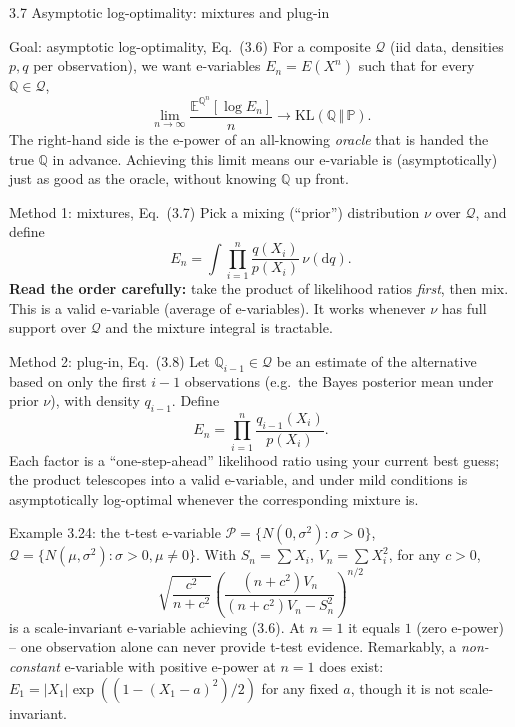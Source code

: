\documentclass[aspectratio=169,10pt]{beamer}
\newcommand{\PP}{\mathbb{P}}
\newcommand{\QQ}{\mathbb{Q}}
\newcommand{\EE}{\mathbb{E}}
\newcommand{\calP}{\mathcal{P}}
\newcommand{\calQ}{\mathcal{Q}}
\newcommand{\KL}[2]{\mathrm{KL}(#1 \,\Vert\, #2)}
\begin{document}
\begin{frame}[allowframebreaks]{3.7 Asymptotic log-optimality: mixtures and plug-in}
  \begin{block}{Goal: asymptotic log-optimality, Eq.~(3.6)}
    For a composite $\calQ$ (iid data, densities $p,q$ per observation), we want e-variables $E_n=E(X^n)$ such that for every $\QQ\in\calQ$,
    \[
      \lim_{n\to\infty} \frac{\EE^{\QQ^n}[\log E_n]}{n} \to \KL{\QQ}{\PP}.
    \]
    The right-hand side is the e-power of an all-knowing \emph{oracle} that is handed the true $\QQ$ in advance. Achieving this limit means our e-variable is (asymptotically) just as good as the oracle, without knowing $\QQ$ up front.
  \end{block}

  \begin{block}{Method 1: mixtures, Eq.~(3.7)}
    Pick a mixing (``prior'') distribution $\nu$ over $\calQ$, and define
    \[
      E_n = \int \prod_{i=1}^n \frac{q(X_i)}{p(X_i)}\,\nu(\mathrm{d}q).
    \]
    \textbf{Read the order carefully:} take the product of likelihood ratios \emph{first}, then mix. This is a valid e-variable (average of e-variables). It works whenever $\nu$ has full support over $\calQ$ and the mixture integral is tractable.
  \end{block}

  \begin{block}{Method 2: plug-in, Eq.~(3.8)}
    Let $\QQ_{i-1}\in\calQ$ be an estimate of the alternative based on only the first $i-1$ observations (e.g.\ the Bayes posterior mean under prior $\nu$), with density $q_{i-1}$. Define
    \[
      E_n = \prod_{i=1}^n \frac{q_{i-1}(X_i)}{p(X_i)}.
    \]
    Each factor is a ``one-step-ahead'' likelihood ratio using your current best guess; the product telescopes into a valid e-variable, and under mild conditions is asymptotically log-optimal whenever the corresponding mixture is.
  \end{block}

  \framebreak

  \begin{exampleblock}{Example 3.24: the t-test e-variable}
    $\calP=\{N(0,\sigma^2):\sigma>0\}$, $\calQ=\{N(\mu,\sigma^2):\sigma>0,\mu\ne0\}$. With $S_n=\sum X_i$, $V_n=\sum X_i^2$, for any $c>0$,
    \[
      \sqrt{\frac{c^2}{n+c^2}}\left(\frac{(n+c^2)V_n}{(n+c^2)V_n - S_n^2}\right)^{n/2}
    \]
    is a scale-invariant e-variable achieving (3.6). At $n=1$ it equals $1$ (zero e-power) -- one observation alone can never provide t-test evidence. Remarkably, a \emph{non-constant} e-variable with positive e-power at $n=1$ does exist: $E_1=|X_1|\exp((1-(X_1-a)^2)/2)$ for any fixed $a$, though it is not scale-invariant.
  \end{exampleblock}


\end{frame}
\end{document}
